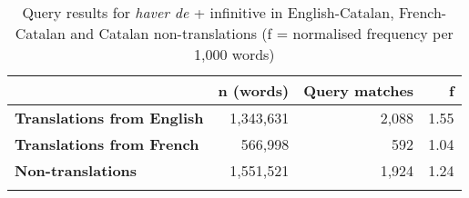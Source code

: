 \documentclass[output=paper,english,spanish,german,english]{langsci/langscibook}
\begin{document}
\begin{table}
\caption{Query results for \textit{haver de} + infinitive in English-Catalan, French-Catalan and Catalan non-translations (f = normalised frequency per 1,000 words)}\label{haver}
  \begin{tabularx}{\textwidth}{Xrrr}
    \lsptoprule
    & {\bfseries n (words)} & {\bfseries Query matches} & {\bfseries f}\\
    \midrule
    {\bfseries Translations from English} & 1,343,631 & 2,088 & 1.55\\
    {\bfseries Translations from French}  & 566,998   & 592   & 1.04\\
    {\bfseries Non-translations}          & 1,551,521 & 1,924 & 1.24\\
    \lspbottomrule
  \end{tabularx}
\end{table}
\end{document}
